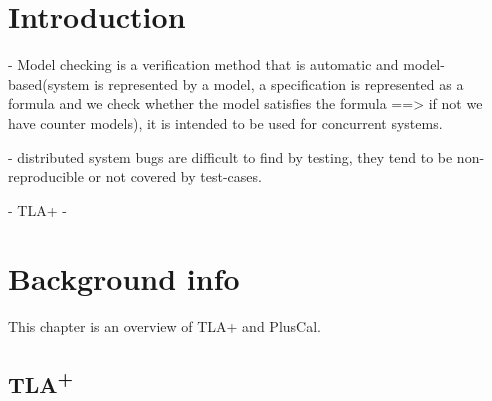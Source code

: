 \documentclass{thesul}
\newcommand{\tlaplus}{TLA\textsuperscript{+}\xspace}
\begin{document}

\WritePartLabelInToc
\WriteChapterLabelInToc


\tableofcontents

\NoChapterHead


\mainmatter


\chapter{Introduction}

- Model checking is a verification method that is automatic and model-based(system is represented by a model, a specification is represented as a formula and we check whether the model satisfies the formula ==> if not we have counter models), it is intended to be used for concurrent systems.

- distributed system bugs are difficult to find by testing, they tend to be non-reproducible or not covered by test-cases.

- TLA+
- 

\chapter{Background info}

This chapter is an overview of TLA+ and PlusCal.
\section{\tlaplus}
\end{document}
